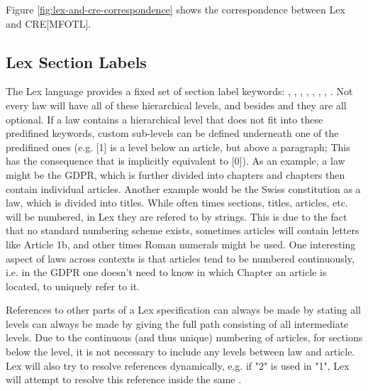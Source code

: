 Figure \ref{fig:lex-and-cre-correspondence}
shows the correspondence between Lex and CRE[MFOTL].

\subsection{Lex Section Labels}
\label{subsection:lex-section-labels}
The Lex language provides a fixed set of section label keywords:
, , , ,
, , , .
Not every law will have all of these hierarchical levels,
and besides  and  they are all optional.
If a law contains a hierarchical level that does not fit into
these predifined keywords, custom sub-levels can be defined
underneath one of the predifined ones
(e.g. [1] is a level below an article,
but above a paragraph; This has the consequence that 
is implicitly equivalent to [0]).
As an example, a law might be the GDPR, which is further divided
into chapters and chapters then contain individual articles.
Another example would be the Swiss constitution as a law, which
is divided into titles.
While often times sections, titles, articles, etc. will be numbered,
in Lex they are refered to by strings.
This is due to the fact that no standard numbering scheme exists,
sometimes articles will contain letters like Article 1b, and other
times Roman numerals might be used.
One interesting aspect of laws across contexts is that
articles tend to be numbered continuously,
i.e. in the GDPR one doesn't need to know in which Chapter an
article is located, to uniquely refer to it.

References to other parts of a Lex specification can
always be made by stating all levels can always be made
by giving the full path consisting of all intermediate levels.
Due to the continuous (and thus unique) numbering of articles,
for sections below the  level, it is not necessary to
include any levels between law and article.
Lex will also try to resolve references dynamically,
e.g. if  "2" is used in  "1", Lex
will attempt to resolve this reference inside the same .

